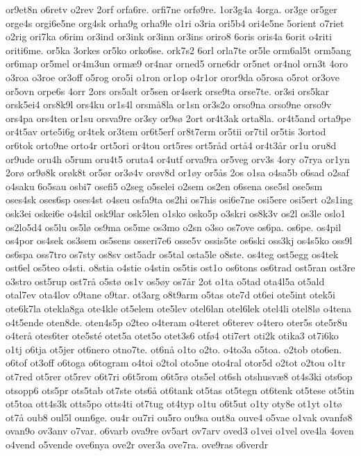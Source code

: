 {or9et8n
o6retv
o2rev
2orf
orfa6re.
orfi7ne
orfø9re.
1or3g4a
4orga.
or3ge
or5ger
orge4s
orgi6e5ne
org4sk
orha9g
orha9le
o1ri
o3ria
ori5b4
ori4e5ne
5orient
o7riet
o2rig
ori7ka
o6rim
or3ind
or3ink
or3inn
or3ins
oriro8
6oris
oris4a
6orit
o4riti
oriti6me.
or5ka
3orkes
or5ko
orko6se.
ork7s2
6orl
orla7te
or5le
orm6al5t
orm5ang
or6map
or5mel
or4m3un
ormæ9
or4nar
orned5
orne6dr
or5net
or4nol
orn3t
4oro
o3roa
o3roe
or3off
o5rog
oro5i
o1ron
or1op
o4r1or
oror9da
o5rosa
o5rot
or3ove
or5ovn
orpe6s
4orr
2ors
ors5alt
or5sen
or4serk
orse9ta
orse7te.
or3si
ors5kar
orsk5ei4
ors8k9l
ors4ku
or1s4l
orsmå8la
or1sn
or3s2o
orso9na
orso9ne
orso9v
ors4pa
ors4ten
or1su
orsva9re
or3sy
or9sø
2ort
or4t3ak
orta8la.
or4t5and
orta9pe
or4t5av
orte5i6g
or4tek
or3tem
or6t5erf
or8t7erm
or5tii
or7til
or5tis
3ortod
or6tok
orto9ne
orto4r
ort5ori
or4tou
ort5res
ort5råd
ortå4
or4t3år
or1u
oru8d
or9ude
oru4h
o5rum
oru4t5
oruta4
or4utf
orva9ra
or5veg
orv3s
4ory
o7rya
or1yn
2orø
or9ø8k
orøk8t
or5ør
or3ø4v
orøv8d
or1øy
or5ås
2os
o1sa
o4sa5b
o6sad
o2saf
o4saku
6o5sau
osbi7
osefi5
o2seg
o5selei
o2sem
os2en
o6sena
ose5sl
ose5sm
oses4sk
oses6sp
oses4st
o4seu
osfa9ta
os2hi
os7his
osi6e7ne
osi5ere
osi5ert
o2s1ing
osk3ei
oskei6e
o4skil
osk9lar
osk5len
o1sko
osko5p
o3skri
os8k3v
os2l
os3le
oslo1
os2lo5d4
os5lu
os5lø
os9ma
os5me
os3mo
o2sn
o3so
os7ove
os6pa.
os6pe.
os4pil
os4por
os4sek
os3sem
os5sens
osseri7e6
osse5v
ossis5te
os6ski
oss3kj
os4s5ko
oss9l
os6spa
oss7tro
os7sty
os8sv
ost5adr
os5tal
osta5le
o8ste.
os4teg
ost5egg
os4tek
ost6el
os5teo
o4sti.
o8stia
o4stie
o4stin
os5tis
ost1o
os6tons
os6trad
ost5ran
ost3re
o3stro
ost5rup
ost7rå
o5stø
os1v
os5øy
os7år
2ot
o1ta
o5tad
ota4l5a
ot5ald
otal7ev
ota4lov
o9tane
o9tar.
ot3arg
o8t9arm
o5tas
ote7d
ot6ei
ote5int
otek5i
ote6k7la
otekla8ga
ote4kle
ot5elem
ote5lev
otel6lan
otel6lek
otel4li
otel8lø
o4tena
o4t5ende
oten8de.
oten4s5p
o2teo
o4teram
o4teret
o6terev
o4tero
oter5s
ote5r8u
o4terå
otes6ter
ote5sté
otet5a
otet5o
otet3s6
otfø4
oti7ert
oti2k
otika3
ot7i6ko
o1tj
o6tja
ot5jer
ot6nero
otno7te.
ot6nå
o1to
o2to.
o4to3a
o5toa.
o2tob
oto6en.
o6tof
ot3off
o6toga
o6togram
o4toi
o2tol
oto5ne
oto4ral
otor5d
o2tot
o2tou
o1tr
ot7red
ot5rer
ot5rev
o6t7ri
o6t5rom
o6t5rø
ots5el
ot6sh
otshusvæ8
ot4s3ki
ots6op
otsopp6
ots5pr
ots5tab
ot7ste
ots6å
ot6tank
ot5tas
ot5tegn
ot6tenk
ot5tese
ot5tin
ot5toa
ott4s3k
otts5po
otts4ti
ot7tug
ot4typ
o1tu
o6t5ut
o1ty
oty8e
ot1yt
o1tø
ot7å
oub8
oul5l
oun6ge.
ou4r
ou7ri
ou5ro
ou9sa
out8a
ouve4
o5vae
o1vak
ovanfø8
ovan9o
ov3anv
o7var.
o6varb
ova9re
ov5art
ov7arv
oved3
o1vei
o1vel
ove4la
4oven
o4vend
o5vende
ove6nya
ove2r
over3a
ove7ra.
ove9ras
o6verdr
}
